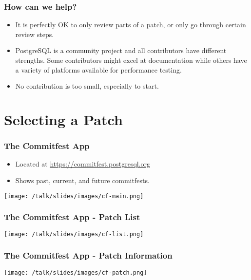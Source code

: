 \begin{frame}
    \frametitle{How can we help?}

    \begin{itemize}
        \item It is perfectly OK to only review parts of a patch, or only go through certain review steps.\pause

        \item PostgreSQL is a community project and all contributors have different strengths.  Some contributors might excel at documentation while others have a variety of platforms available for performance testing.\pause

        \item No contribution is too small, especially to start.
    \end{itemize}
\end{frame}

\section{Selecting a Patch}

\begin{frame}
    \frametitle{The Commitfest App}

    \begin{itemize}
        \item Located at \url{https://commitfest.postgresql.org}
        \item Shows past, current, and future commitfests.
    \end{itemize}

    \texttt{[image: /talk/slides/images/cf-main.png]}
\end{frame}

\begin{frame}
    \frametitle{The Commitfest App - Patch List}

    \texttt{[image: /talk/slides/images/cf-list.png]}
\end{frame}

\begin{frame}
    \frametitle{The Commitfest App - Patch Information}

    \vspace{.5em}
    \texttt{[image: /talk/slides/images/cf-patch.png]}
\end{frame}

